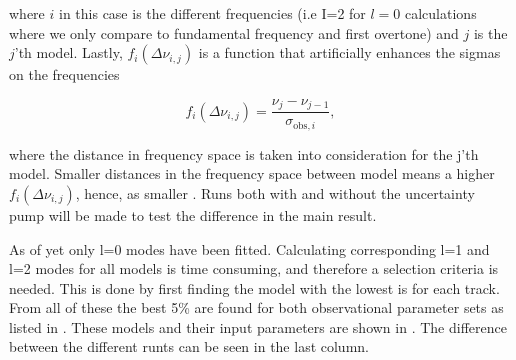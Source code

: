 \noindent where $i$ in this case is the different frequencies (i.e I=2 for $l=0$ calculations where we only compare to fundamental frequency and first overtone) and $j$ is the $j$'th model. Lastly, $f_i(\Delta \nu_{i,j})$ is a function that artificially enhances the sigmas on the frequencies

\begin{equation}
\label{function}
    f_i(\Delta \nu_{i,j}) = \frac{\nu_j - \nu_{j-1}}{\sigma_{\text{obs},i}},
\end{equation}
 
\noindent where the distance in frequency space is taken into consideration for the j'th model. Smaller distances in the frequency space between model means a higher $f_i(\Delta \nu_{i,j})$, hence, as smaller \chis. Runs both with and without the uncertainty pump will be made to test the difference in the main result. 




As of yet only l=0 modes have been fitted. Calculating corresponding l=1 and l=2 modes for all models is time consuming, and therefore a selection criteria is needed. This is done by first finding the model with the lowest \chis is for each track. From all of these the best 5\% are found for both observational parameter sets as listed in . These models and their input parameters are shown in . The difference between the different runts can be seen in the last column.  

